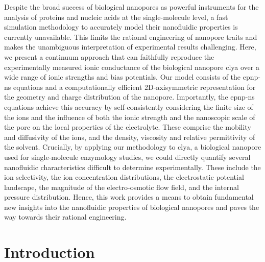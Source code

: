 Despite the broad success of biological nanopores as powerful instruments for the analysis of proteins and
nucleic acids at the single-molecule level, a fast simulation methodology to accurately model their
nanofluidic properties is currently unavailable. This limits the rational engineering of nanopore traits and
makes the unambiguous interpretation of experimental results challenging. Here, we present a continuum
approach that can faithfully reproduce the experimentally measured ionic conductance of the biological
nanopore \gls{clya} over a wide range of ionic strengths and bias potentials. Our model consists of the
\gls{epnp-ns} equations and a computationally efficient 2D-axisymmetric representation for the geometry and
charge distribution of the nanopore. Importantly, the \gls{epnp-ns} equations achieve this accuracy by
self-consistently considering the finite size of the ions and the influence of both the ionic strength and the
nanoscopic scale of the pore on the local properties of the electrolyte. These comprise the mobility and
diffusivity of the ions, and the density, viscosity and relative permittivity of the solvent. Crucially, by
applying our methodology to \gls{clya}, a biological nanopore used for single-molecule enzymology studies, we
could directly quantify several nanofluidic characteristics difficult to determine experimentally. These
include the ion selectivity, the ion concentration distributions, the electrostatic potential landscape, the
magnitude of the electro-osmotic flow field, and the internal pressure distribution. Hence, this work provides
a means to obtain fundamental new insights into the nanofluidic properties of biological nanopores and paves
the way towards their rational engineering.


\section{Introduction}
%
\label{sec:epnp-ns:intro}
%

